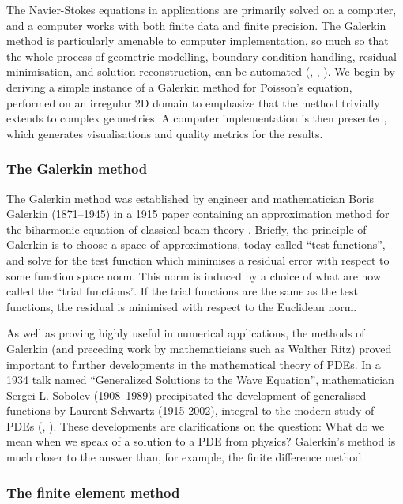 The Navier-Stokes equations in applications are primarily
solved on a computer, and a computer works with both finite data and finite precision. The Galerkin method
is particularly amenable to computer implementation, so much so that the whole process of geometric modelling, boundary condition handling,
residual minimisation, and solution reconstruction, can be automated (\cite{firedrake}, \cite{fenics_book}, \cite{DOLFIN}). We begin by
deriving a simple instance of a Galerkin method for Poisson's equation, performed on an irregular 2D domain to emphasize that the method trivially extends
to complex geometries. A computer implementation is then presented, which generates visualisations and quality metrics for the results.



\subsubsection{The Galerkin method}
The Galerkin method was established by engineer and mathematician Boris Galerkin (1871--1945) in a 1915 paper containing
an approximation method for the biharmonic equation of classical beam theory \cite{boris_galerkin}. Briefly, the principle of Galerkin is to
choose a space of approximations, today called ``test functions'', and solve for the test function which minimises a residual error with respect
to some function space norm. This norm is induced by a choice of what are now called the ``trial functions''. If the trial functions are the same as the test functions,
the residual is minimised with respect to the Euclidean norm.

As well as proving highly useful
in numerical applications, the methods of Galerkin (and preceding work by mathematicians such as Walther Ritz) proved important to further developments
in the mathematical theory of PDEs. In a 1934 talk named ``Generalized Solutions to the Wave Equation'', mathematician Sergei L. Sobolev (1908--1989)
precipitated the development
of generalised functions by Laurent Schwartz (1915-2002), integral to the modern study of PDEs
(\cite{sobolev_web_page}, \cite{one_hundred_years_galerkin}).
These developments are clarifications on the question: What do we mean when we speak of a solution to a PDE from physics? Galerkin's method
is much closer to the answer than, for example, the finite difference method.


\subsubsection{The finite element method}

